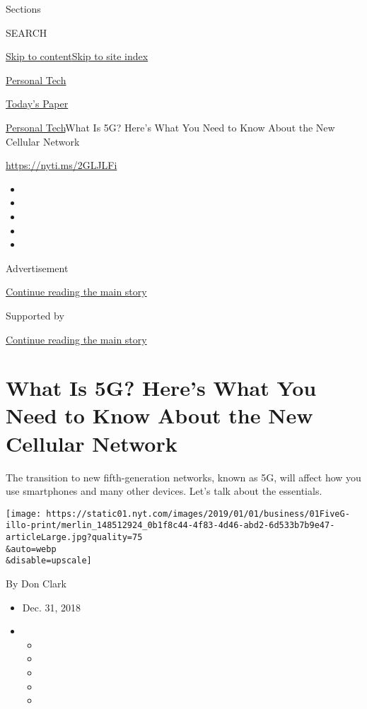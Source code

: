 Sections

SEARCH

\protect\hyperlink{site-content}{Skip to
content}\protect\hyperlink{site-index}{Skip to site index}

\href{https://www.nytimes.com/section/technology/personaltech}{Personal
Tech}

\href{https://myaccount.nytimes.com/auth/login?response_type=cookie\&client_id=vi}{}

\href{https://www.nytimes.com/section/todayspaper}{Today's Paper}

\href{/section/technology/personaltech}{Personal Tech}\textbar{}What Is
5G? Here's What You Need to Know About the New Cellular Network

\url{https://nyti.ms/2GLJLFi}

\begin{itemize}
\item
\item
\item
\item
\item
\end{itemize}

Advertisement

\protect\hyperlink{after-top}{Continue reading the main story}

Supported by

\protect\hyperlink{after-sponsor}{Continue reading the main story}

\hypertarget{what-is-5g-heres-what-you-need-to-know-about-the-new-cellular-network}{%
\section{What Is 5G? Here's What You Need to Know About the New Cellular
Network}\label{what-is-5g-heres-what-you-need-to-know-about-the-new-cellular-network}}

The transition to new fifth-generation networks, known as 5G, will
affect how you use smartphones and many other devices. Let's talk about
the essentials.

\texttt{[image: https://static01.nyt.com/images/2019/01/01/business/01FiveG-illo-print/merlin\_148512924\_0b1f8c44-4f83-4d46-abd2-6d533b7b9e47-articleLarge.jpg?quality=75\\\&auto=webp\\\&disable=upscale]}

By Don Clark

\begin{itemize}
\item
  Dec. 31, 2018
\item
  \begin{itemize}
  \item
  \item
  \item
  \item
  \item
  \end{itemize}
\end{itemize}

